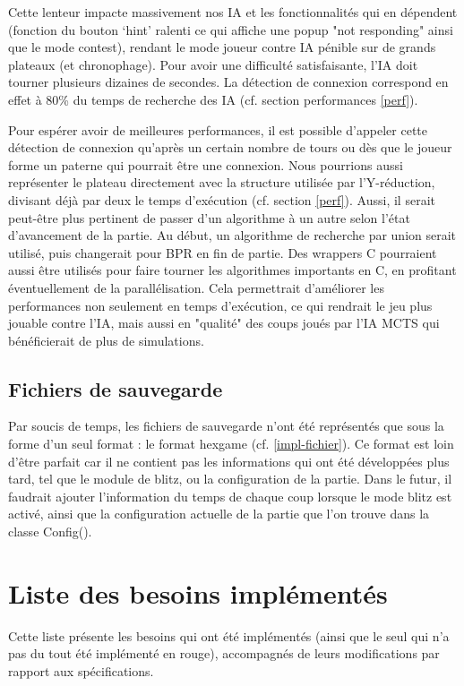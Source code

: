 \documentclass[12pt]{article}
\begin{document}
Cette lenteur impacte massivement nos IA et les fonctionnalités qui en dépendent (fonction du bouton ‘hint’ ralenti ce qui affiche une popup "not responding" ainsi que le mode contest), rendant le mode joueur contre IA pénible sur de grands plateaux (et chronophage). Pour avoir une difficulté satisfaisante, l’IA doit tourner plusieurs dizaines de secondes. La détection de connexion correspond en effet à 80\% du temps de recherche des IA (cf. section performances \ref{perf}).

\bigskip
Pour espérer avoir de meilleures performances, il est possible d’appeler cette détection de connexion qu’après un certain nombre de tours ou dès que le joueur forme un paterne qui pourrait être une connexion. Nous pourrions aussi représenter le plateau directement avec la structure utilisée par l'Y-réduction, divisant déjà par deux le temps d'exécution (cf. section \ref{perf}). Aussi, il serait peut-être plus pertinent de passer d’un algorithme à un autre selon l’état d’avancement de la partie. Au début, un algorithme de recherche par union serait utilisé, puis changerait pour BPR en fin de partie. Des wrappers C pourraient aussi être utilisés pour faire tourner les algorithmes importants en C, en profitant éventuellement de la parallélisation. Cela permettrait d’améliorer les performances non seulement en temps d’exécution, ce qui rendrait le jeu plus jouable contre l’IA, mais aussi en "qualité" des coups joués par l’IA MCTS qui bénéficierait de plus de simulations.

\subsection{Fichiers de sauvegarde}

Par soucis de temps, les fichiers de sauvegarde n’ont été représentés que sous la forme d’un seul format : le format hexgame (cf. \ref{impl-fichier}). Ce format est loin d’être parfait car il ne contient pas les informations qui ont été développées plus tard, tel que le module de blitz, ou la configuration de la partie.
Dans le futur, il faudrait ajouter l’information du temps de chaque coup lorsque le mode blitz est activé, ainsi que la configuration actuelle de la partie que l’on trouve dans la classe Config().

\newpage
{}



\newpage
\appendix
\appendixpage
\addappheadtotoc

\section{Liste des besoins implémentés}
Cette liste présente les besoins qui ont été implémentés (ainsi que le seul qui n'a pas du tout été implémenté en rouge), accompagnés de leurs modifications par rapport aux spécifications.
\end{document}
